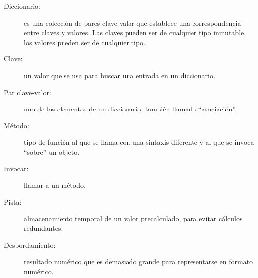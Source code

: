 \begin{description}

\item[Diccionario:] es una colección de pares clave-valor que establece una correspondencia entre claves y valores. Las claves pueden ser de cualquier tipo inmutable, los valores pueden ser de cualquier tipo.

\item[Clave:] un valor que se usa para buscar una entrada en un diccionario.

\item[Par clave-valor:] uno de los elementos de un diccionario, también llamado ``asociación''.

\item[Método:] tipo de función al que se llama con una sintaxis diferente y al que se invoca ``sobre'' un objeto.

\item[Invocar:] llamar a un método.

\item[Pista:] almacenamiento temporal de un valor precalculado, para evitar cálculos redundantes.

\item[Desbordamiento:] resultado numérico que es demasiado grande para representarse en formato numérico.


\end{description}
